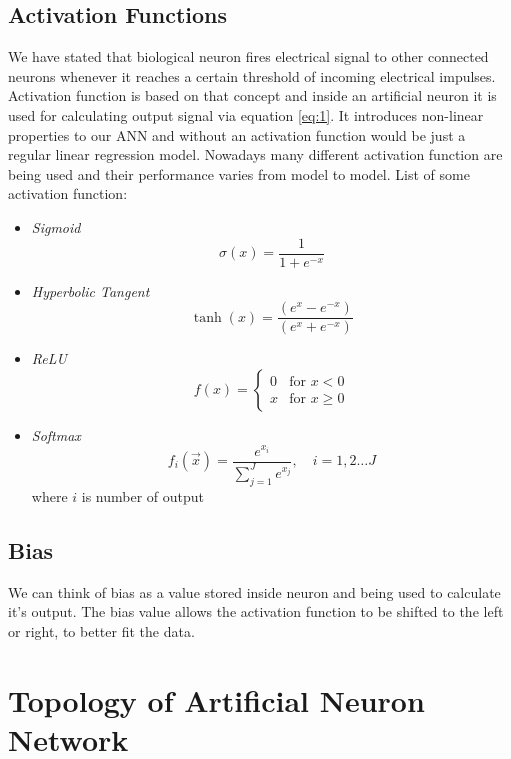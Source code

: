 \subsection{Activation Functions}

We have stated that biological neuron fires electrical signal to other connected neurons whenever it reaches a certain threshold of incoming electrical impulses.
Activation function is based on that concept and inside an artificial neuron it is used for calculating output signal via equation \ref{eq:1}.
It introduces non-linear properties to our ANN and without an activation function would be just a regular linear regression model.
Nowadays many different activation function are being used and their performance varies from model to model. \newline
\newline
List of some activation function:

\begin{itemize}
	\item \textit{Sigmoid} \[ \sigma(x)=\frac{1}{1+e^{-x}} \]
	\item \textit{Hyperbolic Tangent} \[ \tanh(x)=\frac{(e^{x} - e^{-x})}{(e^{x} + e^{-x})} \]
  \item \textit{ReLU}  \[ f(x) = \begin{cases} 0 & \text{for } x < 0 \\ x & \text{for } x \ge 0\end{cases} \]
  \item \textit{Softmax} \[ f_i(\vec{x}) = \frac{e^{x_i}}{\sum_{j=1}^J e^{x_j}}, \quad i = 1, 2 \ldots J \]
    where $i$ is number of output
\end{itemize}

\subsection{Bias}

We can think of bias as a value stored inside neuron and being used to calculate it's output.
The bias value allows the activation function to be shifted to the left or right, to better fit the data.


\section{Topology of Artificial Neuron Network}


